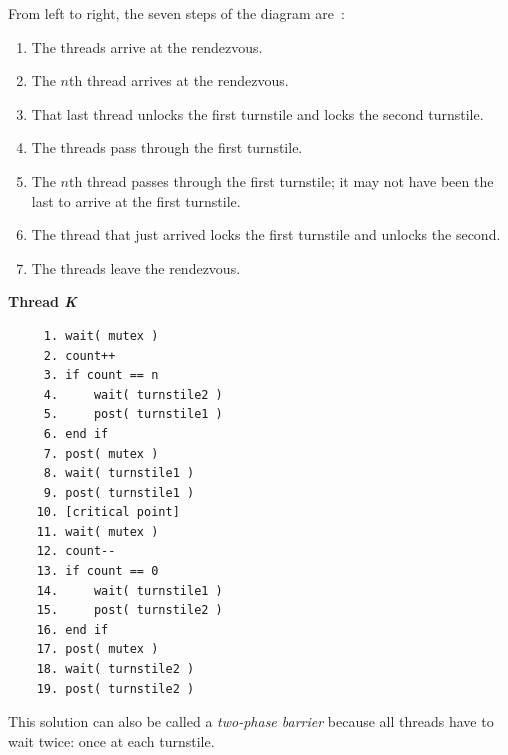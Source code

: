 From left to right, the seven steps of the diagram are~\cite{mte241}:
\begin{enumerate}
	\item The threads arrive at the rendezvous.
	\item The $n$th thread arrives at the rendezvous.
	\item That last thread unlocks the first turnstile and locks the second turnstile.
	\item The threads pass through the first turnstile.
	\item The $n$th thread passes through the first turnstile; it may not have been the last to arrive at the first turnstile.
	\item The thread that just arrived locks the first turnstile and unlocks the second.
	\item The threads leave the rendezvous.
\end{enumerate}

\textbf{Thread \textit{K}}\vspace{-2em}
\begin{verbatim}
	 1. wait( mutex )
	 2. count++
	 3. if count == n
	 4.     wait( turnstile2 )
	 5.     post( turnstile1 )
	 6. end if
	 7. post( mutex )
	 8. wait( turnstile1 )
	 9. post( turnstile1 )
	10. [critical point]
	11. wait( mutex )
	12. count--
	13. if count == 0
	14.     wait( turnstile1 )
	15.     post( turnstile2 )
	16. end if
	17. post( mutex )
	18. wait( turnstile2 )
	19. post( turnstile2 )
  \end{verbatim}
\vspace{-2em}

This solution can also be called a \textit{two-phase barrier} because all threads have to wait twice: once at each turnstile.





